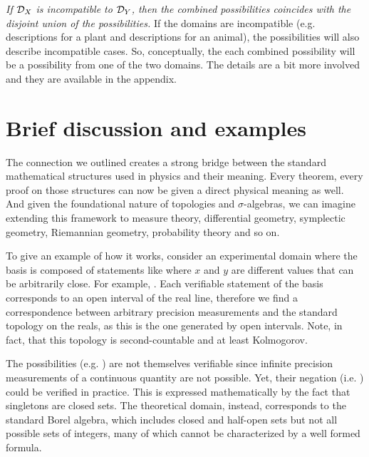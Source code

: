 \documentclass[twocolumn]{article}
\begin{document}
\textit{If $\mathcal{D}_X$ is incompatible to $\mathcal{D}_Y$, then the combined possibilities coincides with the disjoint union of the possibilities.} If the domains are incompatible (e.g. descriptions for a plant and descriptions for an animal), the possibilities will also describe incompatible cases. So, conceptually, the each combined possibility will be a possibility from one of the two domains. The details are a bit more involved and they are available in the appendix.



\section{Brief discussion and examples}

The connection we outlined creates a strong bridge between the standard mathematical structures used in physics and their meaning. Every theorem, every proof on those structures can now be given a direct physical meaning as well. And given the foundational nature of topologies and $\sigma$-algebras, we can imagine extending this framework to measure theory, differential geometry, symplectic geometry, Riemannian geometry, probability theory and so on.

To give an example of how it works, consider an experimental domain where the basis is composed of statements like  where $x$ and $y$ are different values that can be arbitrarily close. For example, . Each verifiable statement of the basis corresponds to an open interval of the real line, therefore we find a correspondence between arbitrary precision measurements and the standard topology on the reals, as this is the one generated by open intervals. Note, in fact, that this topology is second-countable and at least Kolmogorov.

The possibilities (e.g. ) are not themselves verifiable since infinite precision measurements of a continuous quantity are not possible. Yet, their negation (i.e. ) could be verified in practice. This is expressed mathematically by the fact that singletons are closed sets. The theoretical domain, instead, corresponds to the standard Borel algebra, which includes closed and half-open sets but not all possible sets of integers, many of which cannot be characterized by a well formed formula.
\end{document}
